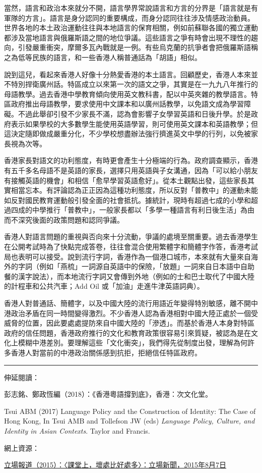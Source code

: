 當然，語言和政治本來就分不開，語言學界常說語言和方言的分界是「語言就是有軍隊的方言」。語言是身分認同的重要構成，而身分認同往往涉及情感政治動員。世界各地的本土政治運動往往與本地語言的保育相關，例如前蘇聯各國的獨立運動都涉及當地語言與俄羅斯語之間的地位爭議。這些語言之爭有時會出現不理性的趨向，引發嚴重衝突，摩爾多瓦內戰就是一例。有些烏克蘭的抗爭者會把俄羅斯語稱之為低等民族的語言，和一些香港人稱普通話為「胡語」相似。

說到這兒，看起來香港人好像十分熱愛香港的本土語言。回顧歷史，香港人本來並不特別捍衛廣州話。特區成立以來第一次的語文之爭，其實是在一九九八年推行的母語教學。過去香港中學教育傾向使用英文教科書，配以中英夾雜的教學語言。特區政府推出母語教學，要求使用中文課本和以廣州話教學，以免語文成為學習障礙。不過此舉卻引發不少家長不滿，認為會影響子女學習英語和日後升學。於是政府表示如果學校的大多數學生能使用英語學習，則可使用英文課本和英語教學；但這決定隨即做成嚴重分化，不少學校想盡辦法強行擠進英文中學的行列，以免被家長視為次等。

香港家長對語文的功利態度，有時更會產生十分極端的行為。政府調查顯示，香港有五千多名母語不是英語的家長，選擇只用英語與子女溝通，因為「可以給小朋友有接觸英語的機會」和相信「愈早學習英語愈好」。從本土觀點出發，這些家長其實相當忘本。有評論認為正正因為這種功利態度，所以反對「普教中」的運動未能如反對國民教育運動般引發全面的社會抵抗。據統計，現時有超過七成的小學和超過四成的中學推行「普教中」，一般家長都以「多學一種語言有利日後生活」為由而不深究後面的政策問題和認同爭議。

香港人對語言問題的重視與否向來十分流動，爭議的處境至關重要。過去香港學生在公開考試時為了快點完成答卷，往往會混合使用繁體字和簡體字作答，香港考試局也表明可以接受。說到流行字詞，香港作為一個港口城市，本來就有大量來自海外的字詞（例如「燕梳」一詞源自英語中的保險，「放題」一詞來自日本語中自助餐的漢字說法），而本地流行字詞又會傳到外地（例如的士和巴士取代了中國大陸的計程車和公共汽車；Add Oil 或「加油」走進牛津英語詞典）。

香港人對普通話、簡體字，以及中國大陸的流行用語近年變得特別敏感，離不開中港政治矛盾在同一時間變得激烈。不少香港人認為香港相對中國大陸正處於一個受威脅的位置，因此要處處提防來自中國大陸的「滲透」。而基於香港人本身對特區政府的信任問題，香港政府推行的文化和教育政策很容易引來質疑，被認為是在文化上模糊中港差別。要理解這些「文化衝突」，我們得先從制度出發，理解為何許多香港人對當前的中港政治關係感到抗拒，拒絕信任特區政府。

\rule[-10pt]{15cm}{0.05em}

伸延閱讀：

彭志銘、鄭政恆編（2018）：《香港粵語撐到底》，香港：次文化堂。

Tsui ABM (2017) Language Policy and the Construction of Identity: The Case of Hong Kong, In Tsui AMB and Tollefson JW (eds) \textit{Language Policy, Culture, and Identity in Asian Contexts}. Taylor and Francis.

網上資源：

\href{https://thestandnews.com/politics/普教中-勿狗衝-2-課堂上-壞處比好處多/}{立場報道（2015）：〈課堂上，壞處比好處多〉：立場新聞，2015年8月7日}